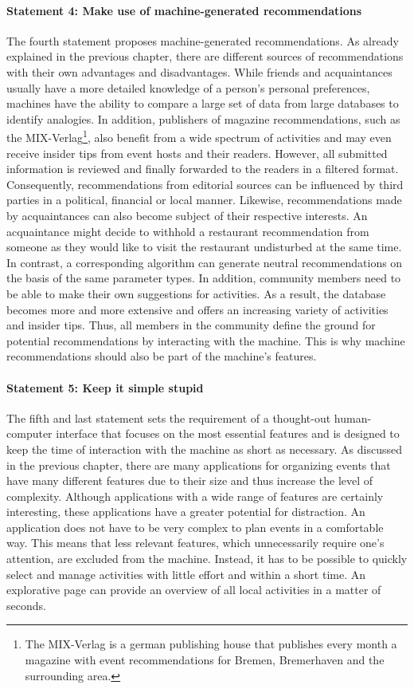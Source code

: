 \documentclass[12pt,numbers=noenddot,parskip,bibliography=totocnumbered,listof=totocnumbered,draft]{scrreprt}
\begin{document}
\paragraph{Statement 4: Make use of machine-generated recommendations}
The fourth statement proposes machine-generated recommendations. As already explained in the previous chapter, there are different sources of recommendations with their own advantages and disadvantages. While friends and acquaintances usually have a more detailed knowledge of a person's personal preferences, machines have the ability to compare a large set of data from large databases to identify analogies. In addition, publishers of magazine recommendations, such as the MIX-Verlag\footnote{The MIX-Verlag is a german publishing house that publishes every month a magazine with event recommendations for Bremen, Bremerhaven and the surrounding area.}, also benefit from a wide spectrum of activities and may even receive insider tips from event hosts and their readers. However, all submitted information is reviewed and finally forwarded to the readers in a filtered format. Consequently, recommendations from editorial sources can be influenced by third parties in a political, financial or local manner. Likewise, recommendations made by acquaintances can also become subject of their respective interests. An acquaintance might decide to withhold a restaurant recommendation from someone as they would like to visit the restaurant undisturbed at the same time.\newline
In contrast, a corresponding algorithm can generate neutral recommendations on the basis of the same parameter types. In addition, community members need to be able to make their own suggestions for activities. As a result, the database becomes more and more extensive and offers an increasing variety of activities and insider tips. Thus, all members in the community define the ground for potential recommendations by interacting with the machine. This is why machine recommendations should also be part of the machine's features.

\paragraph{Statement 5: Keep it simple stupid}
The fifth and last statement sets the requirement of a thought-out human-computer interface that focuses on the most essential features and is designed to keep the time of interaction with the machine as short as necessary. As discussed in the previous chapter, there are many applications for organizing events that have many different features due to their size and thus increase the level of complexity. Although applications with a wide range of features are certainly interesting, these applications have a greater potential for distraction. An application does not have to be very complex to plan events in a comfortable way. \newline
This means that less relevant features, which unnecessarily require one's attention, are excluded from the machine. Instead, it has to be possible to quickly select and manage activities with little effort and within a short time. An explorative page can provide an overview of all local activities in a matter of seconds.
\end{document}
